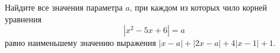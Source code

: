 \begin{ex}
	\begin{condition}
		Найдите все значения параметра \( a \), при каждом из которых чило корней уравнения \[ |x^2-5x+6|=a \] равно наименьшему значению выражения \( |x-a|+|2x-a|+4|x-1|+1 \).
	\end{condition}
	\answer{\( [1;2] \)}
\end{ex}